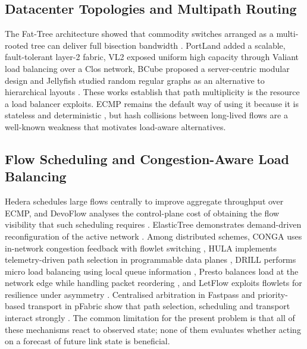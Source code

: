 \documentclass[conference]{IEEEtran}
\begin{document}
\subsection{Datacenter Topologies and Multipath Routing}
The Fat-Tree architecture showed that commodity switches arranged as a multi-rooted tree can deliver full bisection bandwidth \cite{alfares2008}. PortLand added a scalable, fault-tolerant layer-2 fabric, VL2 exposed uniform high capacity through Valiant load balancing over a Clos network, BCube proposed a server-centric modular design and Jellyfish studied random regular graphs as an alternative to hierarchical layouts \cite{mysore2009portland,greenberg2009vl2,guo2009bcube,singla2012jellyfish}. These works establish that path multiplicity is the resource a load balancer exploits. ECMP remains the default way of using it because it is stateless and deterministic \cite{hopps2000}, but hash collisions between long-lived flows are a well-known weakness that motivates load-aware alternatives.

\subsection{Flow Scheduling and Congestion-Aware Load Balancing}
Hedera schedules large flows centrally to improve aggregate throughput over ECMP, and DevoFlow analyses the control-plane cost of obtaining the flow visibility that such scheduling requires \cite{alfares2010hedera,curtis2011devoflow}. ElasticTree demonstrates demand-driven reconfiguration of the active network \cite{heller2010elastictree}. Among distributed schemes, CONGA uses in-network congestion feedback with flowlet switching \cite{alizadeh2014conga}, HULA implements telemetry-driven path selection in programmable data planes \cite{katta2016hula}, DRILL performs micro load balancing using local queue information \cite{ghorbani2015drill}, Presto balances load at the network edge while handling packet reordering \cite{he2015presto}, and LetFlow exploits flowlets for resilience under asymmetry \cite{vanini2017letflow}. Centralised arbitration in Fastpass and priority-based transport in pFabric show that path selection, scheduling and transport interact strongly \cite{perry2014fastpass,alizadeh2013pfabric}. The common limitation for the present problem is that all of these mechanisms react to observed state; none of them evaluates whether acting on a forecast of future link state is beneficial.
\end{document}
